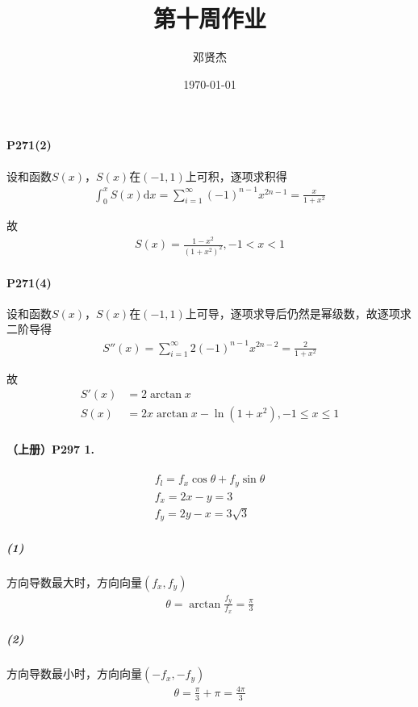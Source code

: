 \documentclass[UTF8]{ctexart}
\title{第十周作业}
\author{邓贤杰}
\date{\today}
\begin{document}
    \maketitle
    \paragraph*{P271(2)}
    设和函数$S(x)$，$S(x)$在$(-1,1)$上可积，逐项求积得
    \begin{align*}
        \int_{0}^{x} S(x) \mathrm{d}x = \sum_{i=1}^{\infty} (-1)^{n-1}x^{2n-1} = \frac{x}{1+x^2} 
    \end{align*}

    故
    \begin{align*}
        S(x) = \frac{1-x^2}{(1+x^2)^2} , -1 < x < 1
    \end{align*}

    \paragraph*{P271(4)}
    设和函数$S(x)$，$S(x)$在$(-1,1)$上可导，逐项求导后仍然是幂级数，故逐项求二阶导得
    \begin{align*}
        S''(x) = \sum_{i=1}^{\infty} 2(-1)^{n-1}x^{2n-2} = \frac{2}{1+x^2} 
    \end{align*}

    故
    \begin{align*}
        S'(x) &= 2\arctan x \\
        S(x)  &= 2x\arctan x - \ln(1+x^2), -1 \le x \le 1
    \end{align*}

    \paragraph*{（上册）P297 1.}
    \begin{align*}
        f_l = f_x \cos \theta + f_y \sin \theta \\
        f_x = 2x - y = 3 \\
        f_y = 2y - x = 3\sqrt{3}
    \end{align*}

    \subparagraph*{(1)}
    方向导数最大时，方向向量$(f_x, f_y)$
    \begin{align*}
        \theta = \arctan \frac{f_y}{f_x} = \frac{\pi}{3} 
    \end{align*}

    \subparagraph*{(2)}
    方向导数最小时，方向向量$(-f_x, -f_y)$
    \begin{align*}
        \theta = \frac{\pi}{3} + \pi = \frac{4\pi}{3}  
    \end{align*}
    
\end{document}
